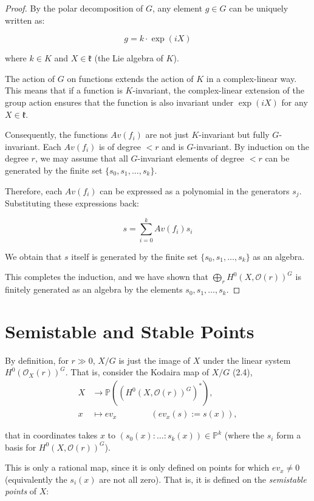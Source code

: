 \documentclass[12pt]{article}
\begin{document}
\begin{proof}
    By the polar decomposition of $G$, any element $g \in G$ can be uniquely written as:

    \[g = k \cdot \exp(iX)\]

    where $k \in K$ and $X \in \mathfrak{k}$ (the Lie algebra of $K$).

    The action of $G$ on functions extends the action of $K$ in a complex-linear way. This means that if a function is $K$-invariant, the complex-linear extension of the group action ensures that the function is also invariant under $\exp(iX)$ for any $X \in \mathfrak{k}$.

    Consequently, the functions $Av(f_i)$ are not just $K$-invariant but fully $G$-invariant. Each $Av(f_i)$ is of degree $< r$ and is $G$-invariant. By induction on the degree $r$, we may assume that all $G$-invariant elements of degree $< r$ can be generated by the finite set $\{s_0, s_1, \ldots, s_k\}$.

    Therefore, each $Av(f_i)$ can be expressed as a polynomial in the generators $s_j$. Substituting these expressions back:

    \[s = \sum_{i=0}^k Av(f_i) s_i\]

    We obtain that $s$ itself is generated by the finite set $\{s_0, s_1, \ldots, s_k\}$ as an algebra.

    This completes the induction, and we have shown that $\bigoplus_{r} H^0(X, \mathcal{O}(r))^G$ is finitely generated as an algebra by the elements $s_0, s_1, \ldots, s_k$.
\end{proof}

\section{Semistable and Stable Points}
By definition, for $r \gg 0$, $X/G$ is just the image of $X$ under the linear system $H^0(\mathcal{O}_X(r))^G$. That is, consider the Kodaira map of $X/G$ (2.4),
\begin{align*}
X &\longrightarrow \mathbb{P}((H^0(X, \mathcal{O}(r))^G)^*), \\
x &\mapsto ev_x \qquad \qquad (ev_x(s) := s(x)),
\end{align*}

that in coordinates takes $x$ to $(s_0(x) : \ldots : s_k(x)) \in \mathbb{P}^k$ (where the $s_i$ form a basis for $H^0(X, \mathcal{O}(r))^G$).

This is only a rational map, since it is only defined on points for which $ev_x \neq 0$ (equivalently the $s_i(x)$ are not all zero). That is, it is defined on the \emph{semistable points} of $X$:
\end{document}
